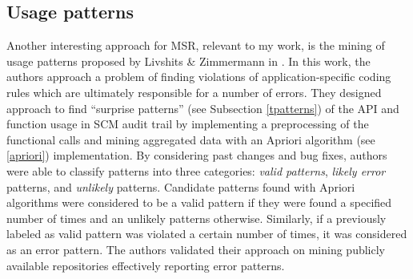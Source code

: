 \subsection{Usage patterns}
Another interesting approach for MSR, relevant to my work, is the mining of usage patterns proposed by Livshits \& Zimmermann in \cite{citeulike:5398684}. In this work, the authors approach a problem of finding violations of application-specific coding rules which are ultimately responsible for a number of errors. They designed approach to find ``surprise patterns'' (see Subsection \ref{tpatterns}) of the API and function usage in SCM audit trail by implementing a preprocessing of the functional calls and mining aggregated data with an Apriori algorithm (see \ref{apriori}) implementation. By considering past changes and bug fixes, authors were able to classify patterns into three categories: \textit{valid patterns}, \textit{likely error} patterns, and \textit{unlikely} patterns. Candidate patterns found with Apriori algorithms were considered to be a valid pattern if they were found a specified number of times and
an unlikely patterns otherwise. Similarly, if a previously labeled as valid pattern was violated a certain number of times, it was considered as an error pattern. The authors validated their approach on mining publicly available repositories effectively reporting error patterns.
